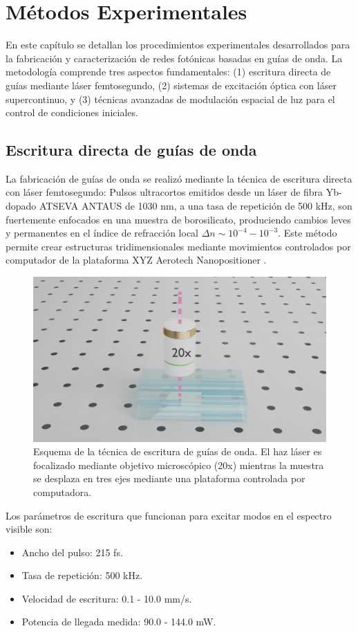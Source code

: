 \chapter{Métodos Experimentales \label{cap:exp}}

En este capítulo se detallan los procedimientos experimentales desarrollados para la fabricación y caracterización de redes fotónicas basadas en guías de onda. La metodología comprende tres aspectos fundamentales: (1) escritura directa de guías mediante láser femtosegundo, (2) sistemas de excitación óptica con láser supercontinuo, y (3) técnicas avanzadas de modulación espacial de luz para el control de condiciones iniciales.


\section{Escritura directa de guías de onda \label{cap:fs}}

La fabricación de guías de onda se realizó mediante la técnica de escritura directa con láser femtosegundo: Pulsos ultracortos emitidos desde un láser de fibra Yb-dopado ATSEVA ANTAUS de 1030 nm, a una tasa de repetición de 500 kHz, son fuertemente enfocados en una muestra de borosilicato, produciendo cambios leves y permanentes en el índice de refracción local $\Delta n \sim 10^{-4}-10^{-3}$. Este método permite crear estructuras tridimensionales mediante movimientos controlados por computador de la plataforma XYZ Aerotech Nanopositioner \citep{femto_writing}.

\begin{figure}[H]
    \centering
    \includegraphics[width=0.6\linewidth, trim={18cm 4cm 15cm 6cm},clip]{media/fabrication1}
    \caption[Esquema de la técnica de escritura de guías de onda.]{Esquema de la técnica de escritura de guías de onda. El haz láser es focalizado mediante objetivo microscópico (20x) mientras la muestra se desplaza en tres ejes mediante una plataforma controlada por computadora.}
\end{figure}

Los parámetros de escritura que funcionan para excitar modos en el espectro visible son:
\begin{itemize}
	\item Ancho del pulso: 215 fs.
    \item Tasa de repetición: 500 kHz.
    \item Velocidad de escritura: 0.1 - 10.0 mm/s.
    \item Potencia de llegada medida: 90.0 - 144.0 mW.
\end{itemize}

